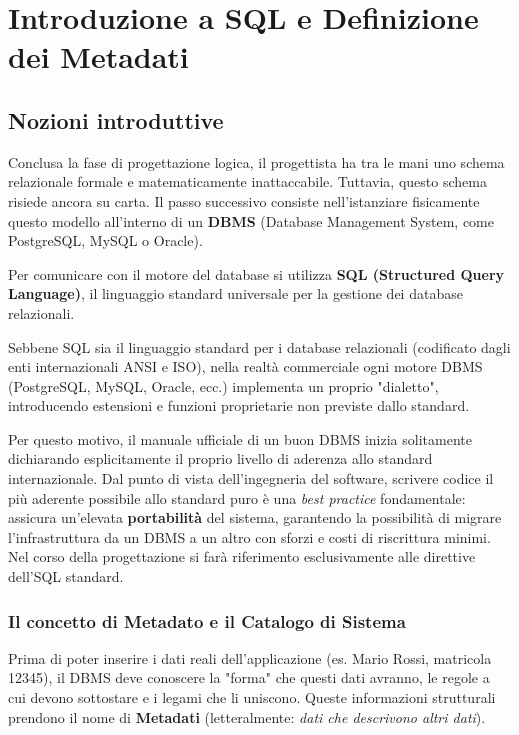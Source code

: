 \chapter{Introduzione a SQL e Definizione dei Metadati}

\section{Nozioni introduttive}

Conclusa la fase di progettazione logica, il progettista ha tra le mani uno schema relazionale formale e matematicamente inattaccabile. Tuttavia, questo schema risiede ancora su carta. Il passo successivo consiste nell'istanziare fisicamente questo modello all'interno di un \textbf{DBMS} (Database Management System, come PostgreSQL, MySQL o Oracle).

Per comunicare con il motore del database si utilizza \textbf{SQL (Structured Query Language)}, il linguaggio standard universale per la gestione dei database relazionali.

\begin{dettagli}
Sebbene SQL sia il linguaggio standard per i database relazionali (codificato dagli enti internazionali ANSI e ISO), nella realtà commerciale ogni motore DBMS (PostgreSQL, MySQL, Oracle, ecc.) implementa un proprio "dialetto", introducendo estensioni e funzioni proprietarie non previste dallo standard. 

Per questo motivo, il manuale ufficiale di un buon DBMS inizia solitamente dichiarando esplicitamente il proprio livello di aderenza allo standard internazionale. Dal punto di vista dell'ingegneria del software, scrivere codice il più aderente possibile allo standard puro è una \textit{best practice} fondamentale: assicura un'elevata \textbf{portabilità} del sistema, garantendo la possibilità di migrare l'infrastruttura da un DBMS a un altro con sforzi e costi di riscrittura minimi. Nel corso della progettazione si farà riferimento esclusivamente alle direttive dell'SQL standard.
\end{dettagli}

\subsection*{Il concetto di Metadato e il Catalogo di Sistema}

Prima di poter inserire i dati reali dell'applicazione (es. Mario Rossi, matricola 12345), il DBMS deve conoscere la "forma" che questi dati avranno, le regole a cui devono sottostare e i legami che li uniscono. 
Queste informazioni strutturali prendono il nome di \textbf{Metadati} (letteralmente: \textit{dati che descrivono altri dati}).

